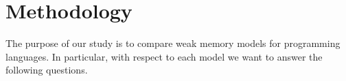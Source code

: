 \documentclass[a4paper,twoside,11pt]{article}
\numberwithin{equation}{section}
\begin{document}







\section{Methodology}

The purpose of our study is to compare weak memory models for programming languages.
In particular, with respect to each model we want to answer the following questions.

\end{document}
